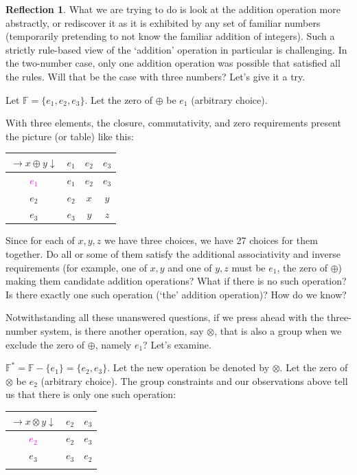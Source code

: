 \documentclass[english,notitlepage,smartquotes]{hgbreport}
\theoremstyle{definition}
\theoremstyle{definition}
\theoremstyle{remark}
\theoremstyle{definition}
\theoremstyle{plain}
\theoremstyle{definition}
\newtheorem{reflection}{Reflection}
\begin{document}
\begin{reflection}
What we are trying to do is look at the addition operation more abstractly, or rediscover it as it is exhibited by any set of familiar numbers (temporarily pretending to not know the familiar addition of integers). Such a strictly rule-based view of the `addition' operation in particular is challenging. In the two-number case, only one addition operation was possible that satisfied all the rules. Will that be the case with three numbers? Let's give it a try.

Let $\mathbb{F}=\{e_1,e_2,e_3\}$. Let the zero of $\oplus$ be $e_1$ (arbitrary choice).

With three elements, the closure, commutativity, and zero requirements present the picture (or table) like this:

\begin{tabular}{c|ccc}
\centering
$\rightarrow x\oplus y\downarrow$ & $e_1$ & $e_2$ & $e_3$\\
\hline
\textcolor{magenta}{$e_1$} & $e_1$ & $e_2$ & $e_3$\\
$e_2$ & $e_2$ & $x$ & $y$\\
$e_3$ & $e_3$ & $y$ & $z$
\label{tab:threenosoplus}
\end{tabular}

Since for each of $x,y,z$ we have three choices, we have 27 choices for them together. Do all or some of them satisfy the additional associativity and inverse requirements (for example, one of $x,y$ and one of $y,z$ must be $e_1$, the zero of $\oplus$) making them candidate addition operations? What if there is no such operation? Is there exactly one such operation (`the' addition operation)? How do we know? 


Notwithstanding all these unanswered questions, if we press ahead with the three-number system, is there another operation, say $\otimes$, that is also a group when we exclude the zero of $\oplus$, namely $e_1$? Let's examine.

$\mathbb{F}^*=\mathbb{F}-\{e_1\}=\{e_2,e_3\}$. Let the new operation be denoted by $\otimes$. Let the zero of $\otimes$ be $e_2$ (arbitrary choice). The group constraints and our observations above tell us that there is only one such operation:

\begin{tabular}{c|cc}
\centering
$\rightarrow x\otimes y\downarrow$ & $e_2$ & $e_3$\\
\hline
\textcolor{magenta}{$e_2$} & $e_2$ & $e_3$\\
$e_3$ & $e_3$ & $e_2$\\
\label{tab:otimesonf*}
\end{tabular}


\end{reflection}
\end{document}
